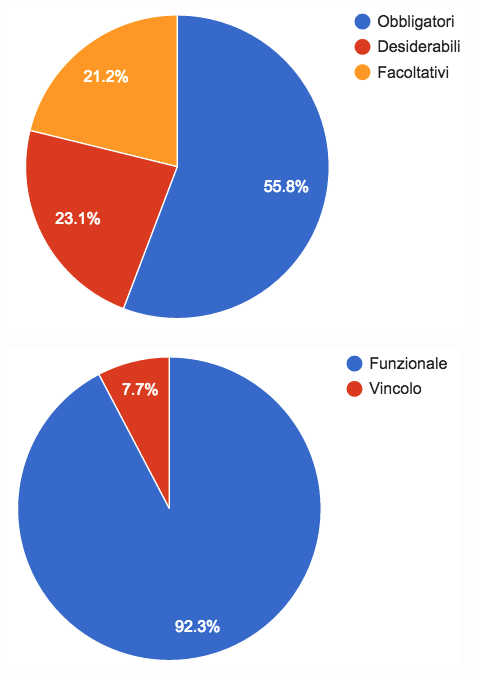 \begin{minipage}{\textwidth}
  \begin{minipage}[b]{0.49\textwidth}
    \centering
    \includegraphics[scale=0.7]{../immagini/requisiti-totale-importanza}
	\end{minipage}
	  \hfill
  \begin{minipage}[b]{0.49\textwidth}
    \centering
  \includegraphics[scale=0.7]{../immagini/requisiti-totale-tipologia}
  \end{minipage}
\end{minipage}



